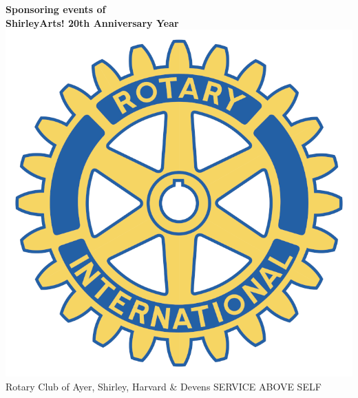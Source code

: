 \documentclass[12pt, a5paper, oneside]{article}
\begin{document}
\begin{center}
\large\textbf{Sponsoring events of\\  
ShirleyArts! 20th Anniversary Year} \\
\includegraphics[scale=0.15]{media/rotary_international.png}\\
Rotary Club of Ayer, Shirley, Harvard \& Devens 
SERVICE ABOVE SELF\\
\end{center} 
\normalsize
\end{document}

